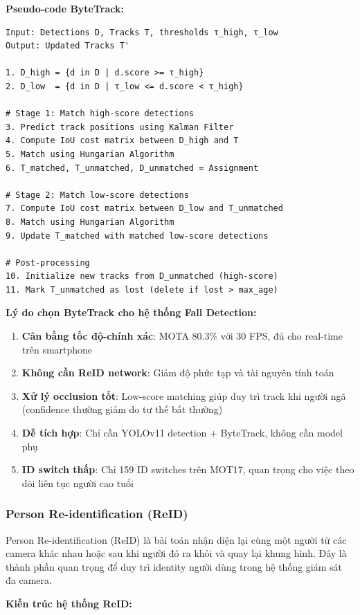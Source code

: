 \textbf{Pseudo-code ByteTrack:}
\begin{verbatim}
Input: Detections D, Tracks T, thresholds τ_high, τ_low
Output: Updated Tracks T'

1. D_high = {d in D | d.score >= τ_high}
2. D_low  = {d in D | τ_low <= d.score < τ_high}

# Stage 1: Match high-score detections
3. Predict track positions using Kalman Filter
4. Compute IoU cost matrix between D_high and T
5. Match using Hungarian Algorithm
6. T_matched, T_unmatched, D_unmatched = Assignment

# Stage 2: Match low-score detections  
7. Compute IoU cost matrix between D_low and T_unmatched
8. Match using Hungarian Algorithm
9. Update T_matched with matched low-score detections

# Post-processing
10. Initialize new tracks from D_unmatched (high-score)
11. Mark T_unmatched as lost (delete if lost > max_age)

\end{verbatim}

\textbf{Lý do chọn ByteTrack cho hệ thống Fall Detection:}
\begin{enumerate}
    \item \textbf{Cân bằng tốc độ-chính xác}: MOTA 80.3\% với 30 FPS, đủ cho real-time trên smartphone
    \item \textbf{Không cần ReID network}: Giảm độ phức tạp và tài nguyên tính toán
    \item \textbf{Xử lý occlusion tốt}: Low-score matching giúp duy trì track khi người ngã (confidence thường giảm do tư thế bất thường)
    \item \textbf{Dễ tích hợp}: Chỉ cần YOLOv11 detection + ByteTrack, không cần model phụ
    \item \textbf{ID switch thấp}: Chỉ 159 ID switches trên MOT17, quan trọng cho việc theo dõi liên tục người cao tuổi
\end{enumerate}

\subsubsection{Person Re-identification (ReID)}

Person Re-identification (ReID) là bài toán nhận diện lại cùng một người từ các camera khác nhau hoặc sau khi người đó ra khỏi và quay lại khung hình. Đây là thành phần quan trọng để duy trì identity người dùng trong hệ thống giám sát đa camera.

\textbf{Kiến trúc hệ thống ReID:}

